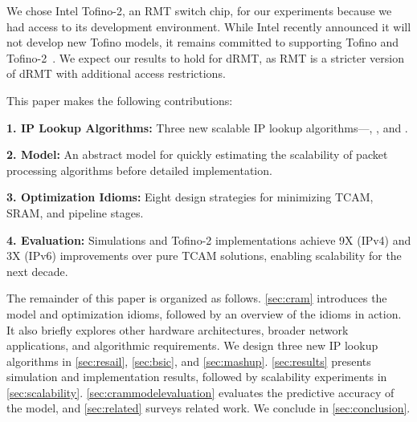 We chose Intel Tofino-2, an RMT switch chip, for our experiments because we had access to its development environment. While Intel recently announced it will not develop new Tofino models, it remains committed to supporting Tofino and Tofino-2~\cite{nick_letter}. We expect our results to hold for dRMT, as RMT is a stricter version of dRMT with additional access restrictions.



This paper makes the following contributions:

\textbf{1. IP Lookup Algorithms:} Three new scalable IP lookup algorithms---\resail, \bsic, and \mashup.

\textbf{2. \cram Model:} An abstract model for quickly estimating the scalability of packet processing algorithms before detailed implementation.

\textbf{3. Optimization Idioms:} Eight design strategies for minimizing TCAM, SRAM, and pipeline stages.

\textbf{4. Evaluation:} Simulations and Tofino-2 implementations achieve 9X (IPv4) and 3X (IPv6) improvements over pure TCAM solutions, enabling scalability for the next decade.

The remainder of this paper is organized as follows. \cref{sec:cram} introduces the \cram model and optimization idioms, followed by an overview of the idioms in action. It also briefly explores other hardware architectures, broader network applications, and algorithmic requirements. We design three new IP lookup algorithms in \cref{sec:resail}, \cref{sec:bsic}, and \cref{sec:mashup}. \cref{sec:results} presents simulation and implementation results, followed by scalability experiments in \cref{sec:scalability}. \cref{sec:crammodelevaluation} evaluates the predictive accuracy of the \cram model, and \cref{sec:related} surveys related work. We conclude in \cref{sec:conclusion}.